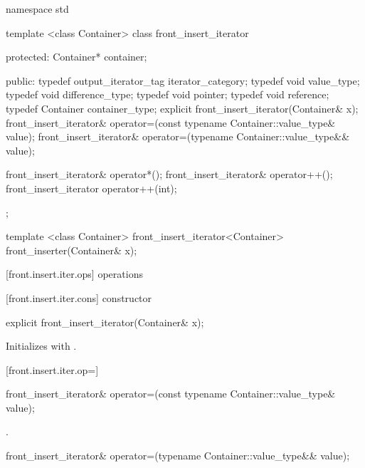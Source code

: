 %
\begin{codeblock}
namespace std {
  template <class Container>
  class front_insert_iterator {
  protected:
    Container* container;

  public:
    typedef output_iterator_tag iterator_category;
    typedef void value_type;
    typedef void difference_type;
    typedef void pointer;
    typedef void reference;
    typedef Container container_type;
    explicit front_insert_iterator(Container& x);
    front_insert_iterator& operator=(const typename Container::value_type& value);
    front_insert_iterator& operator=(typename Container::value_type&& value);

    front_insert_iterator& operator*();
    front_insert_iterator& operator++();
    front_insert_iterator  operator++(int);
  };

  template <class Container>
    front_insert_iterator<Container> front_inserter(Container& x);
}
\end{codeblock}

[front.insert.iter.ops]{ operations}

[front.insert.iter.cons]{ constructor}

%
\begin{itemdecl}
explicit front_insert_iterator(Container& x);
\end{itemdecl}

\begin{itemdescr}
\pnum
\effects
Initializes
with .
\end{itemdescr}

[front.insert.iter.op=]{}

%
\begin{itemdecl}
front_insert_iterator& operator=(const typename Container::value_type& value);
\end{itemdecl}

\begin{itemdescr}
\pnum
\effects
{}

\pnum
\returns
{}.
\end{itemdescr}

%
\begin{itemdecl}
front_insert_iterator& operator=(typename Container::value_type&& value);
\end{itemdecl}

